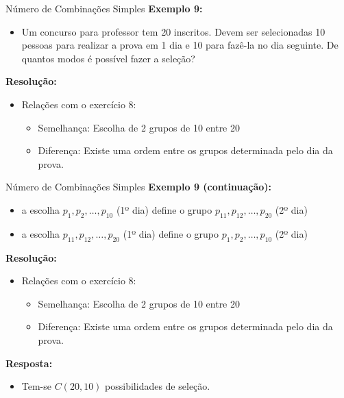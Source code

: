 \documentclass[aspectratio=169]{beamer}
\begin{document}
\begin{frame}{Número de Combinações Simples}
    \textbf{Exemplo 9:}
    \begin{itemize}
        \item Um concurso para professor tem 20 inscritos. Devem ser selecionadas 10 pessoas para realizar a prova em 1 dia e 10 para fazê-la no dia seguinte. De quantos modos é possível fazer a seleção?
    \end{itemize}

    \pause
    \vspace{2mm}

    \textbf{Resolução:}

    \begin{itemize}
        \item Relações com o exercício 8:
        \begin{itemize}
            \item Semelhança: Escolha de 2 grupos de 10 entre 20
            \item Diferença: Existe uma ordem entre os grupos determinada pelo dia da prova.
        \end{itemize}
    \end{itemize}

\end{frame}

\begin{frame}{Número de Combinações Simples}
    \textbf{Exemplo 9 (continuação):}
    \begin{itemize}
        \item a escolha $p_1, p_2, \ldots, p_{10}$ (1º dia) define o grupo $p_{11}, p_{12}, \ldots, p_{20}$ (2º dia)
        \item a escolha $p_{11}, p_{12}, \ldots, p_{20}$ (1º dia) define o grupo $p_1, p_2, \ldots, p_{10}$ (2º dia)
    \end{itemize}

    \pause
    \vspace{2mm}

    \textbf{Resolução:}

    \begin{itemize}
        \item Relações com o exercício 8:
        \begin{itemize}
            \item Semelhança: Escolha de 2 grupos de 10 entre 20
            \item Diferença: Existe uma ordem entre os grupos determinada pelo dia da prova.
        \end{itemize}
    \end{itemize}

    \pause

    \vspace{2mm}

    \textbf{Resposta:}

    \begin{itemize}
        \item Tem-se $C(20,10)$ possibilidades de seleção.
    \end{itemize}
\end{frame}
\end{document}
